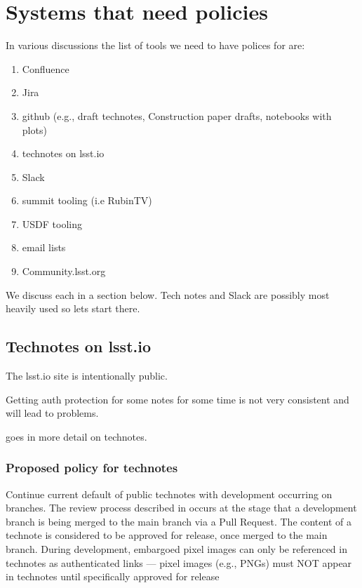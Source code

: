 \section {Systems that need policies}
In various discussions the list of tools we need to have polices for are:

\begin{enumerate}
    \item Confluence
    \item Jira
    \item github (e.g., draft technotes, Construction paper drafts, notebooks with plots)
    \item technotes on lsst.io
    \item Slack
    \item summit tooling (i.e RubinTV)
    \item USDF tooling
    \item email lists
    \item Community.lsst.org
\end{enumerate}

We discuss each in a section below.
Tech notes and Slack are possibly most heavily used so lets start there.



\subsection{Technotes on lsst.io}
The lsst.io site is intentionally public.

Getting auth protection for some notes for some time is not very consistent and will lead to problems.

 goes in more detail on technotes.

\subsubsection{Proposed policy for technotes}
Continue current default of public technotes with development occurring on branches. The review process described in  occurs at the stage that a development branch is being merged to the main branch via a Pull Request. The content of a technote is considered to be approved for release, once merged to the main branch.
During development, embargoed pixel images can only be referenced in technotes as authenticated links --- pixel images (e.g., PNGs) must NOT appear in technotes until specifically approved for release

